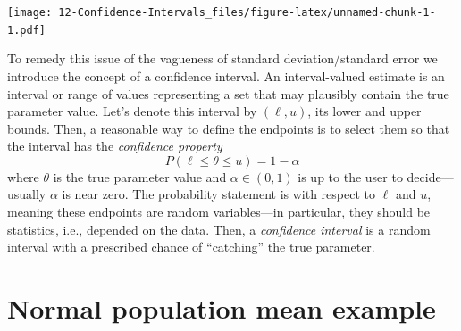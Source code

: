 \documentclass[
]{book}
\begin{document}
\texttt{[image: 12-Confidence-Intervals\_files/figure-latex/unnamed-chunk-1-1.pdf]}

To remedy this issue of the vagueness of standard deviation/standard error we introduce the concept of a confidence interval. An interval-valued estimate is an interval or range of values representing a set that may plausibly contain the true parameter value. Let's denote this interval by \((\ell, u)\), its lower and upper bounds. Then, a reasonable way to define the endpoints is to select them so that the interval has the \emph{confidence property}
\[P(\ell \leq \theta \leq u) = 1-\alpha\]
where \(\theta\) is the true parameter value and \(\alpha \in (0,1)\) is up to the user to decide---usually \(\alpha\) is near zero. The probability statement is with respect to \(\ell\) and \(u\), meaning these endpoints are random variables---in particular, they should be statistics, i.e., depended on the data. Then, a \emph{confidence interval} is a random interval with a prescribed chance of ``catching'' the true parameter.

\hypertarget{normal-population-mean-example}{%
\section{Normal population mean example}\label{normal-population-mean-example}}
\end{document}
